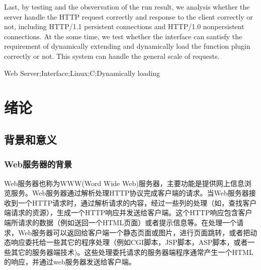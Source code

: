 \documentclass[12pt, twoside, a4paper, xetex]{report}
\begin{document}
	Last, by testing and the obsvervation of the run result, we analysis whether the server handle the HTTP request correctly and response to the client correctly or not, including HTTP/1.1 persistent connections and HTTP/1.0 nonpersistent connections. At the some time, we test whether the interface can santisfy the requirement of dynamically extending and dynamically load the function plugin correctly or not. This system can handle the general scale of requests.


{\enkeywords Web Server;Interface;Linux;C;Dynamically loading}

\newpage
\tableofcontents

\chapter{绪论}

\section{背景和意义}
\subsection{Web服务器的背景}
	Web服务器也称为WWW(Word Wide Web)服务器，主要功能是提供网上信息浏览服务。Web服务器通过解析处理HTTP协议完成客户端的请求。当Web服务器接收到一个HTTP请求时，通过解析请求的内容，经过一些列的处理（如，查找客户端请求的资源），生成一个HTTP响应并发送给客户端。这个HTTP响应包含客户端所请求的数据（例如送回一个HTML页面）或者提示信息等。在处理一个请求，Web服务器可以返回给客户端一个静态页面或图片，进行页面跳转，或者把动态响应委托给一些其它的程序处理（例如CGI脚本，JSP脚本，ASP脚本，或者一些其它的服务器端技术)。这些处理委托请求的服务器端程序通常产生一个HTML的响应，并通过web服务器发送给客户端。
	
\end{document}
